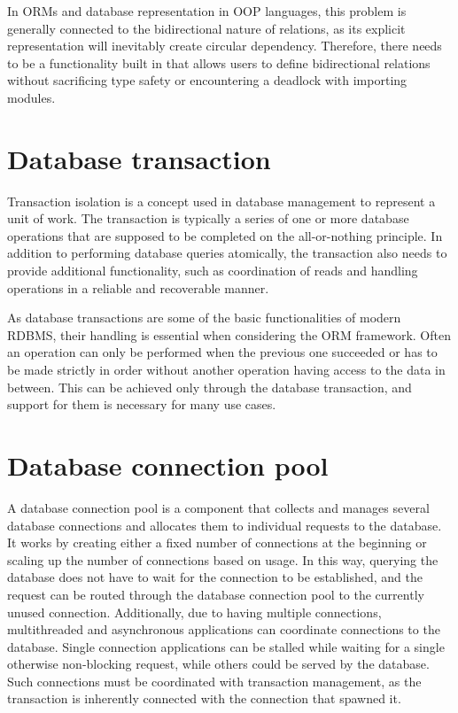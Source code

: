 In ORMs and database representation in OOP languages, this problem is generally
connected to the bidirectional nature of relations, as its explicit
representation will inevitably create circular dependency. Therefore, there
needs to be a functionality built in that allows users to define bidirectional
relations without sacrificing type safety or encountering a deadlock with
importing modules. 


\section{Database transaction}
Transaction isolation is a concept used in database management to represent a
unit of work. The transaction is typically a series of one or more database
operations that are supposed to be completed on the all-or-nothing principle. In
addition to performing database queries atomically, the transaction also needs
to provide additional functionality, such as coordination of reads and handling
operations in a reliable and recoverable manner. 

As database transactions are some of the basic functionalities of modern RDBMS,
their handling is essential when considering the ORM framework. Often an
operation can only be performed when the previous one succeeded or has to be
made strictly in order without another operation having access to the data in
between. This can be achieved only through the database transaction, and support
for them is necessary for many use cases.


\section{Database connection pool}
A database connection pool is a component that collects and manages several
database connections and allocates them to individual requests to the database.
It works by creating either a fixed number of connections at the beginning or
scaling up the number of connections based on usage. In this way, querying the
database does not have to wait for the connection to be established, and the
request can be routed through the database connection pool to the currently
unused connection. Additionally, due to having multiple connections,
multithreaded and asynchronous applications can coordinate connections to the
database. Single connection applications can be stalled while waiting for a
single otherwise non-blocking request, while others could be served by the
database. Such connections must be coordinated with transaction management, as
the transaction is inherently connected with the connection that spawned it. 


